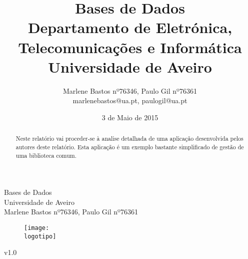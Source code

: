 \documentclass[11pt,openright,oneside]{report}
\begin{document}
%
\def\titulo{Bases de Dados}
\def\data{3 de Maio de 2015}
\def\autores{Marlene Bastos nº76346, Paulo Gil nº76361}
\def\autorescontactos{marlenebastos@ua.pt, paulogil@ua.pt}
\def\versao{v1.0}
\def\departamento{Departamento de Eletrónica, Telecomunicações e Informática}
\def\empresa{Universidade de Aveiro}
\def\logotipo{ua.pdf}
%
%
\begin{titlepage}

\begin{center}
%
\vspace*{50mm}
%
{\Huge \titulo}\\ 
%
\vspace{10mm}
%
{\Large \empresa}\\
%
\vspace{10mm}
%
{\LARGE \autores}\\ 
%
%
\vspace{30mm}
%
\begin{figure}[h]
\center
\texttt{[image: \\logotipo]}
\end{figure}
%
\vspace{30mm}
\end{center}
%
\begin{flushright}
\versao
\end{flushright}
\end{titlepage}

%
%
%
%
\title{%
{\Huge\textbf{\titulo}}\\
{\Large \departamento\\ \empresa}
}
%
\author{%
    \autores \\
    \autorescontactos
}
%
\date{\data}
%
\maketitle

%
%

\begin{abstract}
Neste relatório vai proceder-se à analise detalhada de uma aplicação desenvolvida pelos autores deste relatório. Esta aplicação é um exemplo bastante simplificado de gestão de uma biblioteca comum. 

\end{abstract}

\tableofcontents
\listoffigures

\clearpage
{}
\end{document}
